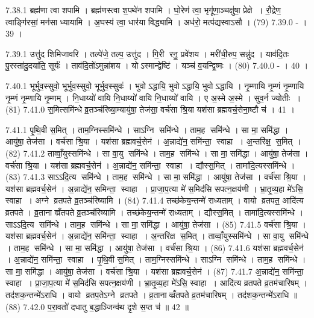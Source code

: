 7.38.1
ब्रह्म॑णा त्वा शपामि । ब्रह्म॑णस्त्वा श॒पथे॑न शपामि । घो॒रेण॑ त्वा॒ भृगू॑णा॒ञ्चक्षु॑षा॒ प्रेक्षे । रौ॒द्रेण॒ त्वाङ्गि॑रसां॒ मन॑सा ध्यायामि । अ॒घस्य॑ त्वा॒ धार॑या विद्ध्यामि । अध॑रो॒ मत्प॑द्यस्वाऽसौ । (79)
7.39.0
- । 39 ।
\anuvakamend

7.39.1
उत्तु॑द शिमिजावरि । तल्पे॑जे॒ तल्प॒ उत्तु॑द । गि॒री रनु॒ प्रवे॑शय । मरी॑ची॒रुप॒ सन्नु॑द । याव॑दि॒तः पु॒रस्ता॑दु॒दया॑ति॒ सूर्यः॑ । ताव॑दि॒तो॑ऽमुन्ना॑शय । योऽस्मान्द्वेष्टि॑ । यञ्च॑ व॒यन्द्वि॒ष्मः । (80)
7.40.0
- । 40 ।
\anuvakamend

7.40.1
भूर्भुव॒स्सुवो॒ भूर्भुव॒स्सुवो॒ भूर्भुव॒स्सुवः॑ । भुवोऽद्धायि॒ भुवोऽद्धायि॒ भुवोऽद्धायि । नृ॒म्णायि नृ॒म्णं नृ॒म्णायि नृ॒म्णं नृ॒म्णायि नृ॒म्णम् । नि॒धाय्यो॑ वायि नि॒धाय्यो॑ वायि नि॒धाय्यो॑ वायि । ए अ॒स्मे अ॒स्मे । सुव॒र्न ज्योतीः । (81)
7.41.0
स॒मित्समि॑न्धे व्र॒तञ्च॑रिष्या॒म्यायु॑षा॒ तेज॑सा॒ वर्च॑सा श्रि॒या यश॑सा ब्रह्मवर्च॒सेना॒ष्टौ च॑ । 41 ।
\anuvakamend

7.41.1
पृ॒थि॒वी स॒मित् । ताम॒ग्निस्समि॑न्धे । साऽग्नि समि॑न्धे । ताम॒ह समि॑न्धे । सा मा॒ समि॑द्धा । आयु॑षा॒ तेज॑सा । वर्च॑सा श्रि॒या । यश॑सा ब्रह्मवर्च॒सेन॑ । अ॒न्नाद्ये॑न॒ समि॑न्ता॒ स्वाहा । अ॒न्तरि॑क्ष॒ स॒मित् । (82)
7.41.2
ताव्वाँ॒युस्समि॑न्धे । सा वा॒यु समि॑न्धे । ताम॒ह समि॑न्धे । सा मा॒ समि॑द्धा । आयु॑षा॒ तेज॑सा । वर्च॑सा श्रि॒या । यश॑सा ब्रह्मवर्च॒सेन॑ । अ॒न्नाद्ये॑न॒ समि॑न्ता॒ स्वाहा । द्यौस्स॒मित् । तामा॑दि॒त्यस्समि॑न्धे । (83)
7.41.3
साऽऽदि॒त्य समि॑न्धे । ताम॒ह समि॑न्धे । सा मा॒ समि॑द्धा । आयु॑षा॒ तेज॑सा । वर्च॑सा श्रि॒या । यश॑सा ब्रह्मवर्च॒सेन॑ । अ॒न्नाद्ये॑न॒ समिन्ता॒ स्वाहा । प्रा॒जा॒प॒त्या मे॑ स॒मिद॑सि सपत्न॒क्षय॑णी । भ्रा॒तृ॒व्य॒हा मे॑ऽसि॒ स्वाहा । अग्ने व्रतपते व्र॒तञ्च॑रिष्यामि । (84)
7.41.4
तच्छ॑केय॒न्तन्मे॑ राध्यताम् । वायो व्रतपत॒ आदि॑त्य व्रतपते । व्र॒तानाव्व्रँतपते व्र॒तञ्च॑रिष्यामि । तच्छ॑केय॒न्तन्मे॑ राध्यताम् । द्यौस्स॒मित् । तामा॑दि॒त्यस्समि॑न्धे । साऽऽदि॒त्य समि॑न्धे । ताम॒ह समि॑न्धे । सा मा॒ समि॑द्धा । आयु॑षा॒ तेज॑सा । (85)
7.41.5
वर्च॑सा श्रि॒या । यश॑सा ब्रह्मवर्च॒सेन॑ । अ॒न्नाद्ये॑न॒ समि॑न्ता॒ स्वाहा । अ॒न्तरि॑क्ष स॒मित् । ताव्वाँ॒युस्समि॑न्धे । सा वा॒यु समि॑न्धे । ताम॒ह समि॑न्धे । सा मा॒ समि॑द्धा । आयु॑षा॒ तेज॑सा । वर्च॑सा श्रि॒या । (86)
7.41.6
यश॑सा ब्रह्मवर्च॒सेन॑ । अ॒न्नाद्ये॑न॒ समि॑न्ता॒ स्वाहा । पृ॒थि॒वी स॒मित् । ताम॒ग्निस्समि॑न्धे । साऽग्नि समि॑न्धे । ताम॒ह समि॑न्धे । सा मा॒ समि॑द्धा । आयु॑षा॒ तेज॑सा । वर्च॑सा श्रि॒या । यश॑सा ब्रह्मवर्च॒सेन॑ । (87)
7.41.7
अ॒न्नाद्ये॑न॒ समि॑न्ता॒ स्वाहा । प्रा॒जा॒प॒त्या मे॑ स॒मिद॑सि सपत्न॒क्षय॑णी । भ्रा॒तृ॒व्य॒हा मे॑ऽसि॒ स्वाहा । आदि॑त्य व्रतपते व्र॒तम॑चारिषम् । तद॑शक॒न्तन्मे॑ऽराधि । वायो व्रतप॒तेऽग्ने व्रतपते । व्र॒तानाव्व्रँतपते व्र॒तम॑चारिषम् । तद॑शक॒न्तन्मे॑ऽराधि ॥ (88)
7.42.0
प॒रा॒वतो॑ दधातु ब॒द्धाञ्जिन्व॑थ दृ॒शे स॒प्त च॑ ॥ 42 ॥
\anuvakamend

